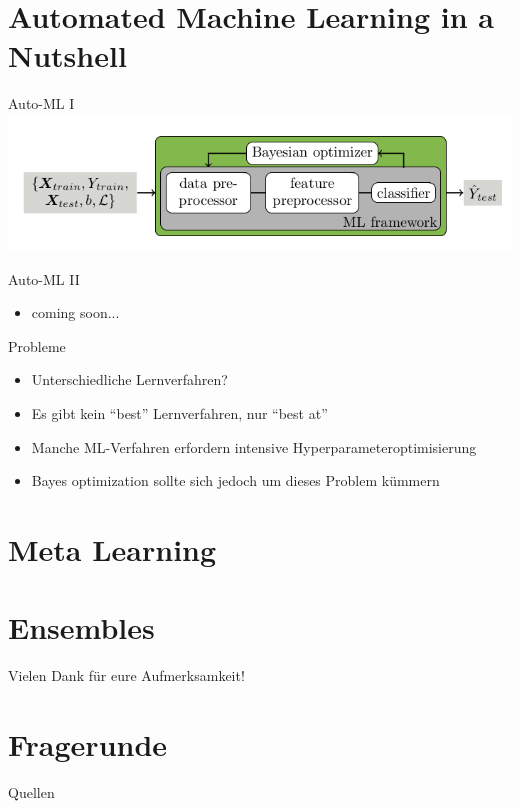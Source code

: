 \documentclass{beamer}
\begin{document}
	
	\section{Automated Machine Learning in a Nutshell}%
	
	
	\begin{frame}{Auto-ML I}
		\includegraphics[width=\linewidth]{Bilder/MachineLeaningInANutshell}
	\end{frame}
	
	\begin{frame}{Auto-ML II}
		\begin{itemize}
			\item coming soon...
		\end{itemize}
	\end{frame}
	
	\begin{frame}{Probleme}
		\begin{itemize}
			\item Unterschiedliche Lernverfahren?
			\item Es gibt kein ``best'' Lernverfahren, nur ``best at''
			\item Manche ML-Verfahren erfordern intensive Hyperparameteroptimisierung
			\item Bayes optimization sollte sich jedoch um dieses Problem kümmern
		\end{itemize}
	\end{frame}
	
	\section{Meta Learning}%
	
	
	
	\section{Ensembles}%
	
	
	\begin{frame}{}
			Vielen Dank für eure Aufmerksamkeit!
	\end{frame}
	
	\section{Fragerunde}%
	
	\begin{frame}{Quellen}
		
		
	\end{frame}
	
\end{document}
